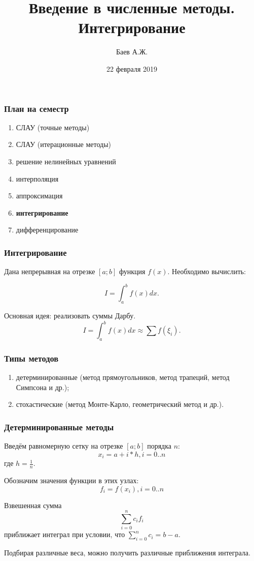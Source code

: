 \documentclass[10pt]{beamer}
\author{Баев А.Ж.}
\title{Введение в численные методы. \\ Интегрирование}
\institute{Казахстанский филиал МГУ}
\date{22 февраля 2019}
\begin{document}
\maketitle


\begin{frame}[fragile]
\frametitle{План на семестр}

\begin{enumerate}
\item СЛАУ (точные методы)
\item СЛАУ (итерационные методы)
\item решение нелинейных уравнений
\item интерполяция
\item аппроксимация
\item \textbf{интегрирование}
\item дифференцирование
\end{enumerate}

\end{frame}


\begin{frame}[fragile]
\frametitle{Интегрирование}

Дана непрерывная на отрезке $[a; b]$ функция $f(x)$. Необходимо вычислить:

$$I = \int_{a}^{b} f(x) dx.$$


Основная идея: реализовать суммы Дарбу.
$$I = \int_{a}^{b} f(x) dx \approx \sum{f(\xi_i)}.$$


\end{frame}

\begin{frame}[fragile]
\frametitle{Типы методов}

\begin{enumerate}
\item детерминированные (метод прямоугольников, метод трапеций, метод Симпсона и др.);
\item стохастические (метод Монте-Карло, геометрический метод и др.).
\end{enumerate}

\end{frame}

\begin{frame}[fragile]
\frametitle{Детерминированные методы}

Введём равномерную сетку на отрезке $[a; b]$ порядка $n$:
$$x_i = a + i * h, i = 0..n$$
где $h = \frac{1}{n}$.


Обозначим значения функции в этих узлах:
$$f_i = f(x_i), i = 0..n$$

Взвешенная сумма
$$\sum_{i=0}^{n}  c_i f_i$$
приближает интеграл при условии, что $\sum_{i=0}^{n} {c_i} = b - a$.


Подбирая различные веса, можно получить различные приближения интеграла. 
\end{frame}
\end{document}
